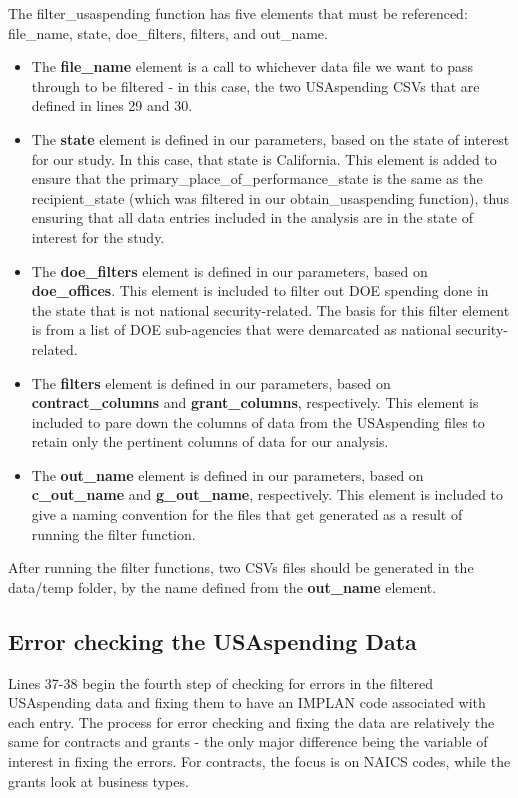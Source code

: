 \documentclass[
]{book}
\providecommand{\tightlist}{%
  \setlength{\itemsep}{0pt}\setlength{\parskip}{0pt}}
\begin{document}
The filter\_usaspending function has five elements that must be referenced: file\_name, state, doe\_filters, filters, and out\_name.

\begin{itemize}
\tightlist
\item
  The \textbf{file\_name} element is a call to whichever data file we want to pass through to be filtered - in this case, the two USAspending CSVs that are defined in lines 29 and 30.
\item
  The \textbf{state} element is defined in our parameters, based on the state of interest for our study. In this case, that state is California. This element is added to ensure that the primary\_place\_of\_performance\_state is the same as the recipient\_state (which was filtered in our obtain\_usaspending function), thus ensuring that all data entries included in the analysis are in the state of interest for the study.
\item
  The \textbf{doe\_filters} element is defined in our parameters, based on \textbf{doe\_offices}. This element is included to filter out DOE spending done in the state that is not national security-related. The basis for this filter element is from a list of DOE sub-agencies that were demarcated as national security-related.
\item
  The \textbf{filters} element is defined in our parameters, based on \textbf{contract\_columns} and \textbf{grant\_columns}, respectively. This element is included to pare down the columns of data from the USAspending files to retain only the pertinent columns of data for our analysis.
\item
  The \textbf{out\_name} element is defined in our parameters, based on \textbf{c\_out\_name} and \textbf{g\_out\_name}, respectively. This element is included to give a naming convention for the files that get generated as a result of running the filter function.
\end{itemize}

After running the filter functions, two CSVs files should be generated in the data/temp folder, by the name defined from the \textbf{out\_name} element.

\hypertarget{error-checking-the-usaspending-data}{%
\subsection{Error checking the USAspending Data}\label{error-checking-the-usaspending-data}}

Lines 37-38 begin the fourth step of checking for errors in the filtered USAspending data and fixing them to have an IMPLAN code associated with each entry. The process for error checking and fixing the data are relatively the same for contracts and grants - the only major difference being the variable of interest in fixing the errors. For contracts, the focus is on NAICS codes, while the grants look at business types.
\end{document}
